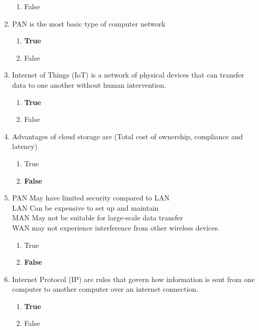 \documentclass{article}
\begin{document}
\begin{enumerate}[label=\arabic*.]
\begin{enumerate}
                \item False
            \end{enumerate}
    \item PAN is the most basic type of computer network
            \begin{enumerate}
                \item \textbf{True}
                \item False
            \end{enumerate}
    \item Internet of Things (IoT) is a network of physical devices that can transfer data to one another without human intervention.
            \begin{enumerate}
                \item \textbf{True}
                \item False
            \end{enumerate}
    \item Advantages of cloud storage are (Total cost of ownership, compliance and latency)
            \begin{enumerate}
                \item True
                \item \textbf{False}
            \end{enumerate}
    \item PAN May have limited security compared to LAN\\
    LAN Can be expensive to set up and maintain\\
    MAN May not be suitable for large-scale data transfer\\
    WAN may not experience interference from other wireless devices.
            \begin{enumerate}
                \item True
                \item \textbf{False}
            \end{enumerate}
    \item Internet Protocol (IP) are rules that govern how information is sent from one computer to another computer over an internet connection.
            \begin{enumerate}
                \item \textbf{True}
                \item False
            \end{enumerate}

     
    

\end{enumerate}
\end{document}
